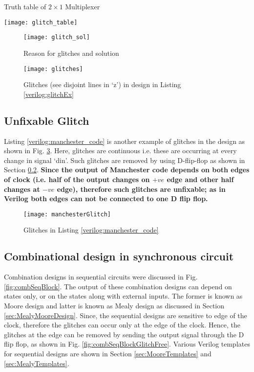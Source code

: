\begin{table}[!h]
	\centering
	\caption{Truth table of $2 \times 1$ Multiplexer}
	\texttt{[image: glitch\_table]}
	\label{tbl:glitch_table}
\end{table}

\begin{figure}[!h]
	\centering
	\texttt{[image: glitch\_sol]}
	\caption{Reason for glitches and solution}
	\label{fig:glitch_sol}
\end{figure}

\begin{figure}[!h]
	\centering
	\texttt{[image: glitches]}
	\caption{Glitches (see disjoint lines in `z') in design in Listing \ref{verilog:glitchEx}}
	\label{fig:glitches}
\end{figure}



\subsection{Unfixable Glitch}
Listing \ref{verilog:manchester_code} is another example of glitches in the design as shown in Fig. \ref{fig:manchesterGlitch}. Here, glitches are continuous i.e. these are occurring at every change in signal `din'. Such glitches are removed by using D-flip-flop as shown in Section \ref{sec:glitchInsSync}. \textbf{Since the output of Manchester code depends on both edges of clock (i.e. half of the output changes on $+ve$ edge and other half changes at $-ve$ edge), therefore such glitches are unfixable; as in Verilog both edges can not be connected to one D flip flop.}

\begin{figure}[!h]
	\centering
	\texttt{[image: manchesterGlitch]}
	\caption{Glitches in Listing \ref{verilog:manchester_code}}
	\label{fig:manchesterGlitch}
\end{figure}




\subsection{Combinational design in synchronous circuit}\label{sec:glitchInsSync}
Combination designs in sequential circuits were discussed in Fig. \ref{fig:combSeqBlock}. The output of these combination designs can depend on states only, or on the states along with external inputs. The former is known as Moore design and latter is known as Mealy design as discussed in Section \ref{sec:MealyMooreDesign}. Since, the sequential designs are sensitive to edge of the clock, therefore the glitches can occur only at the edge of the clock. Hence, the glitches at the edge can be removed by sending the output signal through the D flip flop, as shown in Fig. \ref{fig:combSeqBlockGlitchFree}. Various Verilog templates for sequential designs are shown in Section \ref{sec:MooreTemplates} and \ref{sec:MealyTemplates}. 

